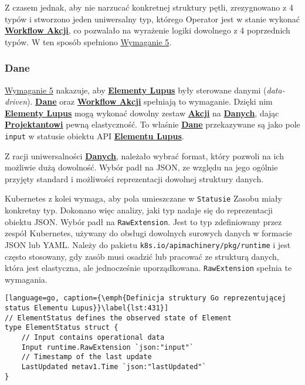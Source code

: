 Z czasem jednak, aby nie narzucać konkretnej struktury pętli, zrezygnowano z 4 typów i stworzono jeden uniwersalny typ, którego Operator jest w stanie wykonać \hyperlink{def:workflow-petli}{\textbf{Workflow Akcji}}, co pozwalało na wyrażenie logiki dowolnego z 4 poprzednich typów. W ten sposób spełniono \hyperref[req:5]{Wymaganie 5}.

\subsubsection{Dane}

\hyperref[req:5]{Wymaganie 5} nakazuje, aby \hyperlink{def:element-lupus}{\textbf{Elementy Lupus}} były sterowane danymi (\textit{data-driven}). \hyperlink{def:dane}{\textbf{Dane}} oraz \hyperlink{def:workflow-petli}{\textbf{Workflow Akcji}} spełniają to wymaganie. Dzięki nim \hyperlink{def:element-lupus}{\textbf{Elementy Lupus}} mogą wykonać dowolny zestaw \hyperlink{def:akcja}{\textbf{Akcji}} na \hyperlink{def:dane}{\textbf{Danych}}, dając \hyperlink{def:projektant}{\textbf{Projektantowi}} pewną elastyczność. To właśnie \hyperlink{def:dane}{\textbf{Dane}} przekazywane są jako pole \texttt{input} w statusie obiektu API \hyperlink{def:element-lupus}{\textbf{Elementu Lupus}}. 

Z racji uniwersalności \hyperlink{def:dane}{\textbf{Danych}}, należało wybrać format, który pozwoli na ich możliwie dużą dowolność. Wybór padł na JSON, ze względu na jego ogólnie przyjęty standard i możliwości reprezentacji dowolnej struktury danych. 

Kubernetes z kolei wymaga, aby pola umieszczane w \texttt{Statusie} Zasobu miały konkretny typ. Dokonano więc analizy, jaki typ nadaje się do reprezentacji obiektu JSON. Wybór padł na \texttt{RawExtension}. Jest to typ zdefiniowany przez zespół Kubernetes, używany do obsługi dowolnych surowych danych w formacie JSON lub YAML. Należy do pakietu \texttt{k8s.io/apimachinery/pkg/runtime} i jest często stosowany, gdy zasób musi osadzić lub pracować ze strukturą danych, która jest elastyczna, ale jednocześnie uporządkowana. \texttt{RawExtension} spełnia te wymagania.

\begin{lstlisting}[language=go, caption={\emph{Definicja struktury Go reprezentującej status Elementu Lupus}}\label{lst:431}]
// ElementStatus defines the observed state of Element
type ElementStatus struct {
	// Input contains operational data
	Input runtime.RawExtension `json:"input"`
	// Timestamp of the last update
	LastUpdated metav1.Time `json:"lastUpdated"`
}
\end{lstlisting}

